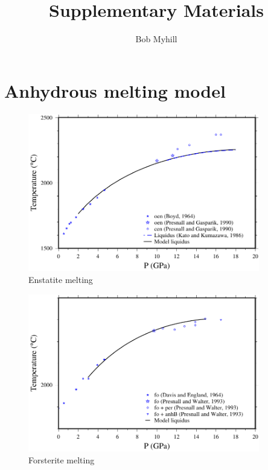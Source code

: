 \documentclass[11pt,a4paper,english]{article}
\title{Supplementary Materials}
\author{Bob Myhill}
\begin{document}
\maketitle

\section{Anhydrous melting model}

\begin{figure}[!htb]
\centering
\includegraphics[width=0.9\textwidth]{figures/enstatite_melting}
\caption{Enstatite melting}
\label{fig:enstatite_melting}
\end{figure}

\begin{figure}[!htb]
\centering
\includegraphics[width=0.9\textwidth]{figures/forsterite_melting}
\caption{Forsterite melting}
\label{fig:forsterite_melting}
\end{figure}
\end{document}
